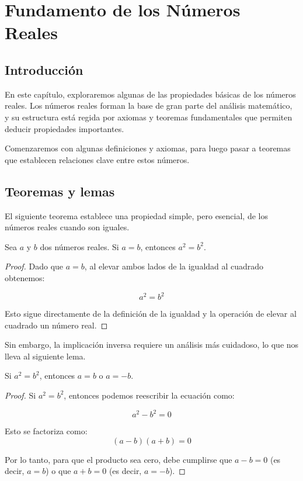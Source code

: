 \chapter{Fundamento de los Números Reales}

\section{Introducción}

En este capítulo, exploraremos algunas de las propiedades básicas de los números reales. Los números reales forman la base de gran parte del análisis matemático, y su estructura está regida por axiomas y teoremas fundamentales que permiten deducir propiedades importantes.

Comenzaremos con algunas definiciones y axiomas, para luego pasar a teoremas que establecen relaciones clave entre estos números.

\section{Teoremas y lemas}

El siguiente teorema establece una propiedad simple, pero esencial, de los números reales cuando son iguales.

\begin{theorem}
Sea $a$ y $b$ dos números reales. Si $a = b$, entonces $a^2 = b^2$.
\end{theorem}

\begin{proof}
Dado que $a = b$, al elevar ambos lados de la igualdad al cuadrado obtenemos:

\begin{equation*}
a^2 = b^2
\end{equation*}


Esto sigue directamente de la definición de la igualdad y la operación de elevar al cuadrado un número real.
\end{proof}

Sin embargo, la implicación inversa requiere un análisis más cuidadoso, lo que nos lleva al siguiente lema.

\begin{lemma}
Si $a^2 = b^2$, entonces $a = b$ o $a = -b$.
\end{lemma}

\begin{proof}
Si $a^2 = b^2$, entonces podemos reescribir la ecuación como:

\begin{equation*}
a^2 - b^2 = 0
\end{equation*}

Esto se factoriza como:
\begin{equation*}
(a - b)(a + b) = 0
\end{equation*}

Por lo tanto, para que el producto sea cero, debe cumplirse que $a - b = 0$ (es decir, $a = b$) o que $a + b = 0$ (es decir, $a = -b$).
\end{proof}

